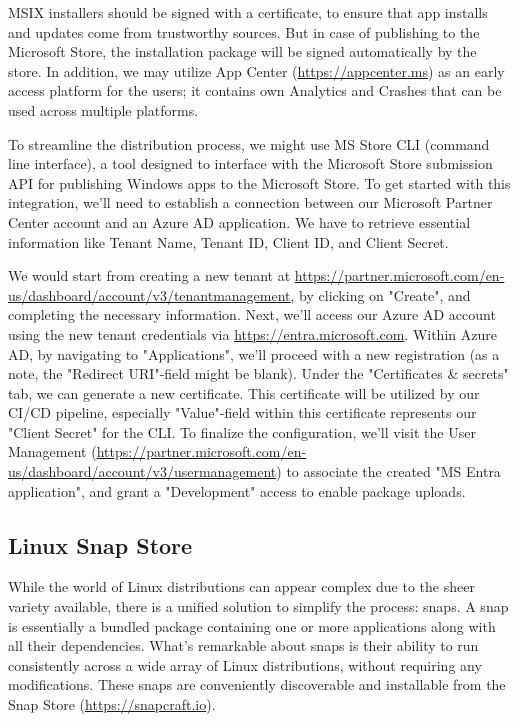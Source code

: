 \noindent MSIX installers should be signed with a certificate, to ensure that app installs and updates come from 
trustworthy sources. But in case of publishing to the Microsoft Store, the installation package will be signed 
automatically by the store. In addition, we may utilize App Center (\href{https://appcenter.ms}{https://appcenter.ms}) 
as an early access platform for the users; it contains own Analytics and Crashes that can be used across multiple 
platforms.

To streamline the distribution process, we might use MS Store CLI (command line interface), a tool designed to 
interface with the Microsoft Store submission API for publishing Windows apps to the Microsoft Store. To get started 
with this integration, we'll need to establish a connection between our Microsoft Partner Center account and an Azure 
AD application. We have to retrieve essential information like Tenant Name, Tenant ID, Client ID, and Client Secret. 

We would start from creating a new tenant at 
\href{https://partner.microsoft.com/en-us/dashboard/account/v3/tenantmanagement}{https://partner.microsoft.com/en-us/dashboard/account/v3/tenantmanagement},
by clicking on "Create", and completing the necessary information. Next, we'll access our Azure AD account using the 
new tenant credentials via \href{https://entra.microsoft.com}{https://entra.microsoft.com}. Within Azure AD, by 
navigating to "Applications", we'll proceed with a new registration (as a note, the "Redirect URI"-field might be blank).
Under the "Certificates \& secrets" tab, we can generate a new certificate. This certificate will be utilized by our 
CI/CD pipeline, especially "Value"-field within this certificate represents our "Client Secret" for the CLI. To finalize 
the configuration, we'll visit the User Management 
(\href{https://partner.microsoft.com/en-us/dashboard/account/v3/usermanagement}{https://partner.microsoft.com/en-us/dashboard/account/v3/usermanagement})
to associate the created "MS Entra application", and grant a "Development" access to enable package uploads. 


\subsection{Linux Snap Store}

While the world of Linux distributions can appear complex due to the sheer variety available, there is a unified 
solution to simplify the process: snaps. A snap is essentially a bundled package containing one or more applications 
along with all their dependencies. What's remarkable about snaps is their ability to run consistently across a wide 
array of Linux distributions, without requiring any modifications. These snaps are conveniently discoverable and 
installable from the Snap Store (\href{https://snapcraft.io}{https://snapcraft.io}).

